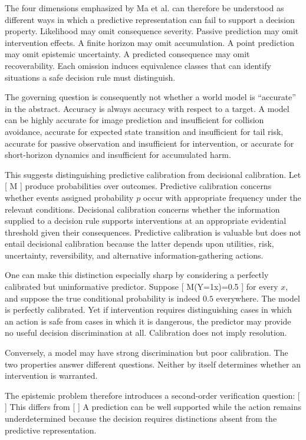 \documentclass[11pt]{article}
\begin{document}
The four dimensions emphasized by Ma et al. can therefore be understood as different ways in which a predictive representation can fail to support a decision property. Likelihood may omit consequence severity. Passive prediction may omit intervention effects. A finite horizon may omit accumulation. A point prediction may omit epistemic uncertainty. A predicted consequence may omit recoverability. Each omission induces equivalence classes that can identify situations a safe decision rule must distinguish.

The governing question is consequently not whether a world model is ``accurate'' in the abstract. Accuracy is always accuracy with respect to a target. A model can be highly accurate for image prediction and insufficient for collision avoidance, accurate for expected state transition and insufficient for tail risk, accurate for passive observation and insufficient for intervention, or accurate for short-horizon dynamics and insufficient for accumulated harm.

This suggests distinguishing predictive calibration from decisional calibration. Let
[
M
]
produce probabilities over outcomes. Predictive calibration concerns whether events assigned probability $p$ occur with appropriate frequency under the relevant conditions. Decisional calibration concerns whether the information supplied to a decision rule supports interventions at an appropriate evidential threshold given their consequences. Predictive calibration is valuable but does not entail decisional calibration because the latter depends upon utilities, risk, uncertainty, reversibility, and alternative information-gathering actions.

One can make this distinction especially sharp by considering a perfectly calibrated but uninformative predictor. Suppose
[
M(Y=1\mid x)=0.5
]
for every $x$, and suppose the true conditional probability is indeed $0.5$ everywhere. The model is perfectly calibrated. Yet if intervention requires distinguishing cases in which an action is safe from cases in which it is dangerous, the predictor may provide no useful decision discrimination at all. Calibration does not imply resolution.

Conversely, a model may have strong discrimination but poor calibration. The two properties answer different questions. Neither by itself determines whether an intervention is warranted.

The epistemic problem therefore introduces a second-order verification question:
[
]
This differs from
[
]
A prediction can be well supported while the action remains underdetermined because the decision requires distinctions absent from the predictive representation.
\end{document}
